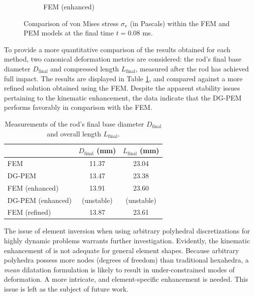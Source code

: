 \begin{figure}[!h]
\begin{subfigure}[b]{0.32\linewidth}
    			\caption{FEM (enhanced) \label{fig:taylor_bar_fem_fbar}}
    \end{subfigure} 
    \caption{Comparison of von Mises stress $\sigma_{\mathrm v}$ (in Pascals) within the FEM and PEM models at the final time $t = 0.08$ ms.}
  \label{fig:taylor_bar_stresses}
\end{figure}

To provide a more quantitative comparison of the results obtained for each method, two canonical deformation metrics are considered: the rod's final base diameter $D_{\text{final}}$ and compressed length $L_{\text{final}}$, measured after the rod has achieved full impact. The results are displayed in Table \ref{tab:change_in_length_measurements}, and compared against a more refined solution obtained using the FEM. Despite the apparent stability issues pertaining to the kinematic enhancement, the data indicate that the DG-PEM performs favorably in comparison with the FEM.

\begin{table}[!ht]
  \begin{center}
    \begin{tabular}{| l || c | c |}
    \hline
                & $D_{\text{final}}$ (mm) & $L_{\text{final}}$ (mm) \\ \hline \hline
    FEM               & 11.37 & 23.04 \\ \hline
    DG-PEM            & 13.47 & 23.38 \\ \hline
    FEM (enhanced)    & 13.91 & 23.60 \\ \hline
    DG-PEM (enhanced) & (unstable) & (unstable) \\ \hline
    FEM (refined)     & 13.87 & 23.61 \\
    \hline
    \end{tabular}
    \caption{Measurements of the rod's final base diameter $D_{\text{final}}$ and overall length $L_{\text{final}}$.}
    \vspace{-5pt}
    \label{tab:change_in_length_measurements}
    \vspace{-10pt}
  \end{center}
\end{table}

The issue of element inversion when using arbitrary polyhedral discretizations for highly dynamic problems warrants further investigation. Evidently, the kinematic enhancement of \cite{Rashid:06} is not adequate for general element shapes. Because arbitrary polyhedra possess more nodes (degrees of freedom) than traditional hexahedra, a \textit{mean} dilatation formulation is likely to result in under-constrained modes of deformation. A more intricate, and element-specific enhancement is needed. This issue is left as the subject of future work.